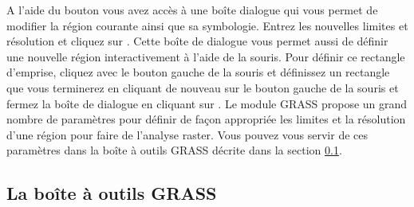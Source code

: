 A l'aide du bouton  vous avez accès à une boîte dialogue qui vous permet de modifier la région courante ainsi que sa symbologie. Entrez les nouvelles limites et résolution et cliquez sur . Cette boîte de dialogue vous permet aussi de définir une nouvelle région interactivement à l'aide de la souris. Pour définir ce rectangle d'emprise, cliquez avec le bouton gauche de la souris et définissez un rectangle que vous terminerez en cliquant de nouveau sur le bouton gauche de la souris et fermez la boîte de dialogue en cliquant sur . Le module GRASS  propose un grand nombre de paramètres pour définir de façon appropriée les limites et la résolution d'une région pour faire de l'analyse raster. Vous pouvez vous servir de ces paramètres dans la boîte à outils GRASS décrite dans la section \ref{subsec:grass_toolbox}.



\subsection{La boîte à outils GRASS}\label{subsec:grass_toolbox} 

